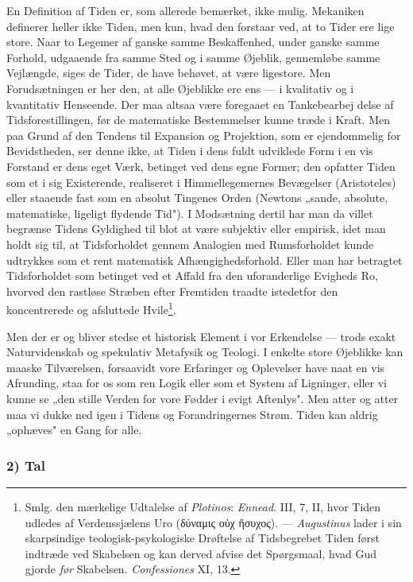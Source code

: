 \documentclass[12pt,a4paper]{book}
\newcommand{\opage}[1]{\marginnote{\footnotesize\textit{[#1]}}}
\begin{document}
En Definition af Tiden er, som allerede bemærket, ikke mulig. Mekaniken
definerer heller ikke Tiden, men kun, hvad den forstaar ved, at to Tider
ere lige store. Naar to Legemer af ganske samme Beskaffenhed, under
ganske samme Forhold, udgaaende fra samme Sted og i samme Øjeblik,
gennemløbe samme Vejlængde, siges de Tider, de have behøvet, at være
ligestore. Men Forudsætningen er her den, at alle Øjeblikke ere ens ---
i kvalitativ og i kvantitativ Henseende. Der maa altsaa være foregaaet
en Tankebearbej%
\opage{189}delse af Tidsforestillingen, før de matematiske
Bestemmelser kunne træde i Kraft. Men paa Grund af den Tendens til
Expansion og Projektion, som er ejendommelig for Bevidstheden, ser denne
ikke, at Tiden i dens fuldt udviklede Form i en vis Forstand er dens
eget Værk, betinget ved dens egne Former; den opfatter Tiden som et i
sig Existerende, realiseret i Himmellegemernes Bevægelser (Aristoteles)
eller staaende fast som en absolut Tingenes Orden (Newtons „sande,
absolute, matematiske, ligeligt flydende Tid"). I Modsætning dertil har
man da villet begrænse Tidens Gyldighed til blot at være subjektiv eller
empirisk, idet man holdt sig til, at Tidsforholdet gennem Analogien med
Rumsforholdet kunde udtrykkes som et rent matematisk
Afhængighedsforhold. Eller man har betragtet Tidsforholdet som betinget
ved et Affald fra den uforanderlige Evigheds Ro, hvorved den rastløse
Stræben efter Fremtiden traadte istedetfor den koncentrerede og
afsluttede Hvile\footnote{Smlg. den mærkelige Udtalelse af
\emph{Plotinos}: \emph{Ennead}. III, 7, II, hvor Tiden udledes af
Verdenssjælens Uro (δύναμις οὐχ ἥσυχος). --- \emph{Augustinus} lader i
sin skarpsindige teologisk-psykologiske Drøftelse af Tidsbegrebet Tiden
først indtræde ved Skabelsen og kan derved afvise det Spørgsmaal, hvad
Gud gjorde \emph{før} Skabelsen. \emph{Confessiones} XI, 13.}.

Men der er og bliver stedse et historisk Element i vor Erkendelse ---
trods exakt Naturvidenskab og spekulativ Metafysik og Teologi. I enkelte
store Øjeblikke kan maaske Tilværelsen, forsaavidt vore Erfaringer og
Oplevelser have naat en vis Afrunding, staa for os som ren Logik eller
som et System af Ligninger, eller vi kunne se „den stille Verden for
vore Fødder i evigt Aftenlys". Men atter og atter maa vi dukke ned igen
i Tidens og Forandringernes Strøm. Tiden kan aldrig „ophæves" en Gang
for alle.

\subsubsection*{2) Tal}
\end{document}
